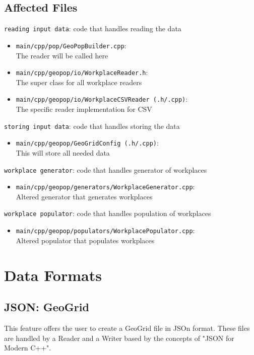 \subsection{Affected Files}
\begin{compactitem}
	\item \texttt{reading input data}: code that handles reading the data
	\begin{itemize}
		\item \texttt{main/cpp/pop/GeoPopBuilder.cpp}: \\ The reader will be called here
		\item \texttt{main/cpp/geopop/io/WorkplaceReader.h}: \\
		The super class for all workplace readers
		\item \texttt{main/cpp/geopop/io/WorkplaceCSVReader (.h/.cpp)}: \\
		The specific reader implementation for CSV
	\end{itemize}
	\item \texttt{storing input data}: code that handles storing the data
	\begin{itemize}
		\item \texttt{main/cpp/geopop/GeoGridConfig (.h/.cpp)}: \\
		This will store all needed data
	\end{itemize}
	\item \texttt{workplace generator}: code that handles generator of workplaces
	\begin{itemize}
		\item \texttt{main/cpp/geopop/generators/WorkplaceGenerator.cpp}:\\
		Altered generator that generates workplaces
	\end{itemize}
	\item \texttt{workplace populator}: code that handles population of workplaces
	\begin{itemize}
		\item \texttt{main/cpp/geopop/populators/WorkplacePopulator.cpp}:\\
		Altered populator that populates workplaces
	\end{itemize}
\end{compactitem}

\newpage

\section{Data Formats}
\label{section:DataFormats}

\subsection{JSON: GeoGrid}
This feature offers the user to create a GeoGrid file in JSOn format. These files are handled by a Reader and a Writer based by the concepts of "JSON for Modern C++".




